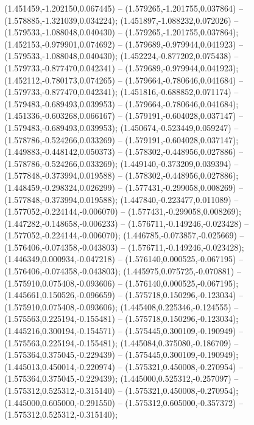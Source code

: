  (1.451459,-1.202150,0.067445) -- (1.579265,-1.201755,0.037864) -- (1.578885,-1.321039,0.034224);
 (1.451897,-1.088232,0.072026) -- (1.579533,-1.088048,0.040430) -- (1.579265,-1.201755,0.037864);
 (1.452153,-0.979901,0.074692) -- (1.579689,-0.979944,0.041923) -- (1.579533,-1.088048,0.040430);
 (1.452224,-0.877202,0.075438) -- (1.579733,-0.877470,0.042341) -- (1.579689,-0.979944,0.041923);
 (1.452112,-0.780173,0.074265) -- (1.579664,-0.780646,0.041684) -- (1.579733,-0.877470,0.042341);
 (1.451816,-0.688852,0.071174) -- (1.579483,-0.689493,0.039953) -- (1.579664,-0.780646,0.041684);
 (1.451336,-0.603268,0.066167) -- (1.579191,-0.604028,0.037147) -- (1.579483,-0.689493,0.039953);
 (1.450674,-0.523449,0.059247) -- (1.578786,-0.524266,0.033269) -- (1.579191,-0.604028,0.037147);
 (1.449883,-0.448142,0.050373) -- (1.578302,-0.448956,0.027886) -- (1.578786,-0.524266,0.033269);
 (1.449140,-0.373209,0.039394) -- (1.577848,-0.373994,0.019588) -- (1.578302,-0.448956,0.027886);
 (1.448459,-0.298324,0.026299) -- (1.577431,-0.299058,0.008269) -- (1.577848,-0.373994,0.019588);
 (1.447840,-0.223477,0.011089) -- (1.577052,-0.224144,-0.006070) -- (1.577431,-0.299058,0.008269);
 (1.447282,-0.148658,-0.006233) -- (1.576711,-0.149246,-0.023428) -- (1.577052,-0.224144,-0.006070);
 (1.446785,-0.073857,-0.025669) -- (1.576406,-0.074358,-0.043803) -- (1.576711,-0.149246,-0.023428);
 (1.446349,0.000934,-0.047218) -- (1.576140,0.000525,-0.067195) -- (1.576406,-0.074358,-0.043803);
 (1.445975,0.075725,-0.070881) -- (1.575910,0.075408,-0.093606) -- (1.576140,0.000525,-0.067195);
 (1.445661,0.150526,-0.096659) -- (1.575718,0.150296,-0.123034) -- (1.575910,0.075408,-0.093606);
 (1.445408,0.225346,-0.124555) -- (1.575563,0.225194,-0.155481) -- (1.575718,0.150296,-0.123034);
 (1.445216,0.300194,-0.154571) -- (1.575445,0.300109,-0.190949) -- (1.575563,0.225194,-0.155481);
 (1.445084,0.375080,-0.186709) -- (1.575364,0.375045,-0.229439) -- (1.575445,0.300109,-0.190949);
 (1.445013,0.450014,-0.220974) -- (1.575321,0.450008,-0.270954) -- (1.575364,0.375045,-0.229439);
 (1.445000,0.525312,-0.257097) -- (1.575312,0.525312,-0.315140) -- (1.575321,0.450008,-0.270954);
 (1.445000,0.605000,-0.291550) -- (1.575312,0.605000,-0.357372) -- (1.575312,0.525312,-0.315140);
